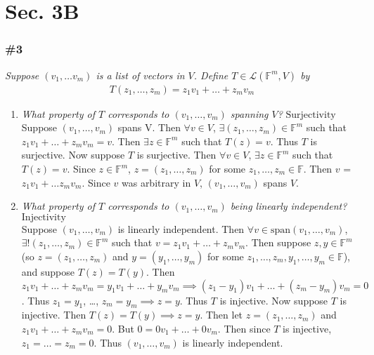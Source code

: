 \documentclass[12pt]{article}
\begin{document}
\section*{Sec. 3B}
\subsubsection*{\#3}
{\it Suppose $(v_1, \dots v_m)$ is a list of vectors in $V$.  Define $T \in \mathcal{L}(\mathbb{F}^m, V)$ by}
\begin{align*}
T(z_1, \dots, z_m) = z_1v_1 + \dots + z_mv_m
\end{align*}
\begin{enumerate}[\ \ \ \bf (a)\ ]
\item {\it What property of $T$ corresponds to $(v_1, \dots, v_m)$ spanning $V$?} $\boxed{\text{Surjectivity}}$ \\

Suppose $(v_1, \dots, v_m)$ spans V.  Then $\forall v \in V$, $\exists (z_1, \dots, z_m) \in \mathbb{F}^m$ such that $z_1v_1 + \dots + z_mv_m = v$.  Then $\exists z \in \mathbb{F}^m$ such that $T(z) = v$.  Thus $T$ is surjective.  Now suppose $T$ is surjective.  Then $\forall v \in V$, $\exists z \in \mathbb{F}^m$ such that $T(z) = v$.  Since $z \in \mathbb{F}^m$, $z = (z_1, \dots, z_m)$ for some $z_1, \dots, z_m \in \mathbb{F}$.  Then $v$ = $z_1v_1 + \dots z_mv_m$.  Since $v$ was arbitrary in $V$, $(v_1, \dots, v_m)$ spans $V$.
\item {\it What property of $T$ corresponds to $(v_1, \dots, v_m)$ being linearly independent?} $\boxed{\text{Injectivity}}$ \\

Suppose $(v_1, \dots, v_m)$ is linearly independent.  Then $\forall v \in \text{span}(v_1, \dots, v_m)$, \\$\exists! (z_1, \dots, z_m) \in \mathbb{F}^m$ such that $v = z_1v_1 + \dots + z_mv_m$.  Then suppose $z, y \in \mathbb{F}^m$ (so $z = (z_1, \dots, z_m)$ and $y = (y_1, \dots, y_m)$ for some $z_1, \dots, z_m, y_1, \dots, y_m \in \mathbb{F}$), and suppose $T(z) = T(y)$.  Then $z_1v_1 + \dots + z_mv_m = y_1v_1 + \dots + y_mv_m \implies (z_1 - y_1)v_1 + \dots + (z_m - y_m)v_m = 0$.  Thus $z_1 = y_1$, \dots, $z_m = y_m \implies z = y$.  Thus $T$ is injective.  Now suppose $T$ is injective.  Then $T(z) = T(y) \implies z = y$.  Then let $z = (z_1, \dots, z_m)$ and $z_1v_1 + \dots + z_mv_m = 0$.  But $0 = 0v_1 + \dots + 0v_m$.  Then since $T$ is injective, $z_1 = \dots = z_m = 0$.  Thus $(v_1, \dots, v_m)$ is linearly independent.

\end{enumerate}
\end{document}
